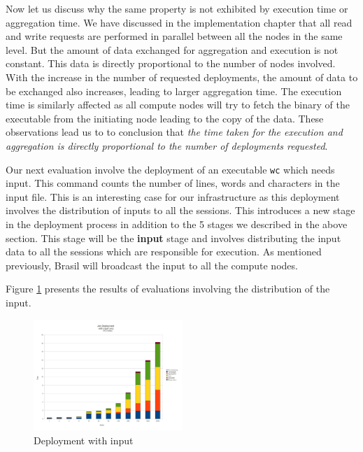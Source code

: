 Now let us discuss why the same property is not exhibited by execution time or
aggregation time. We have discussed in the implementation chapter that all
read and write requests are performed in parallel between all the nodes in the
same level.  But the amount of data exchanged for aggregation and execution is
not constant.  This data is directly proportional to the number of nodes
involved.  With the increase in the number of requested deployments, the
amount of data to be exchanged also increases, leading to larger aggregation
time. The execution time is similarly affected as all compute nodes will
try to fetch the binary of the executable from the initiating node leading to
the copy of the data. These observations lead us to to conclusion that
\textit{the time taken for the execution and aggregation is directly
proportional to the number of deployments requested}.

Our next evaluation involve the deployment of an executable \texttt{wc} which
needs input. This command counts the number of lines, words and characters in
the input file.  This is an interesting case for our infrastructure as this
deployment involves the distribution of inputs to all the sessions.  This
introduces a new stage in the deployment process in addition to the 5 stages we
described in the above section.  This stage will be the \textbf{input} stage and
involves distributing the input data to all the sessions which are responsible
for execution.  As mentioned previously,
Brasil will broadcast the input to all the compute
nodes.

Figure \ref{fig:wc_graph} presents the results of evaluations involving the
distribution of the input.


\begin{figure}[h]
  \begin{center}
    \leavevmode
      \includegraphics[height=0.2\textheight,width=0.5\textwidth]
		{./img/wc_graph}
    \caption{Deployment with input}
    \label{fig:wc_graph}
  \end{center}
\end{figure}

